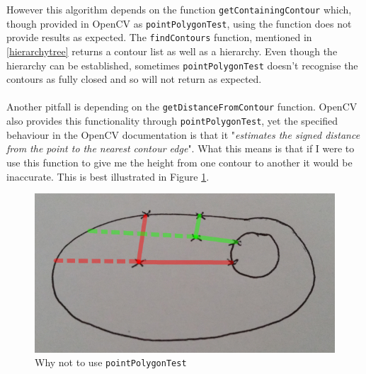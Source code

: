 \documentclass[11pt]{article}
\begin{document}
However this algorithm depends on the function \texttt{getContainingContour}
which, though provided in OpenCV as \texttt{pointPolygonTest}, using
the function does not provide results as expected. The \texttt{findContours}
function, mentioned in \ref{hierarchytree} returns a contour list as
well as a hierarchy. Even though the hierarchy can be established, sometimes
\texttt{pointPolygonTest} doesn't recognise the contours as fully closed and
so will not return as expected.\\
\\
Another pitfall is depending on the \texttt{getDistanceFromContour} function.
OpenCV also provides this functionality through \texttt{pointPolygonTest},
yet the specified behaviour in the OpenCV documentation is that it 
"\textit{estimates the signed distance from the point to the nearest 
contour edge}". What this means is that if I were to use this function
to give me the height from one contour to another it would be inaccurate.
This is best illustrated in Figure \ref{fig:polygonTest}. 

\begin{figure}
	\centering
	\includegraphics[scale=0.6]{pics/polygontest.jpg}
	\caption{Why not to use \texttt{pointPolygonTest}}
	\label{fig:polygonTest}
\end{figure}
\end{document}
